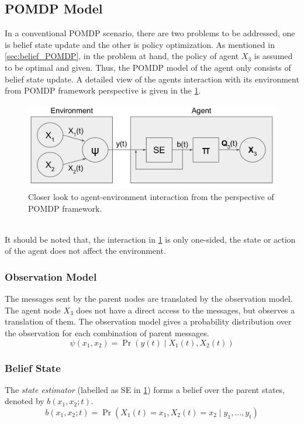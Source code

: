 \subsection{POMDP Model}
In a conventional POMDP scenario, there are two problems to be addressed, one is belief state update and the other is policy optimization. As mentioned in \cref{sec:belief_POMDP}, in the problem at hand, the policy of agent $ X_3 $ is assumed to be optimal and given. Thus, the POMDP model of the agent only consists of belief state update. A detailed view of the agents interaction with its environment from POMDP framework perspective is given in the \cref{fig:POMDP_pers}. \\
\begin{figure}[htb]
	\begin{center}
		\includegraphics[width=.75\textwidth]{figures/POMDP_graph}
		\caption{Closer look to agent-environment interaction from the perspective of POMDP framework.}
		\label{fig:POMDP_pers}
	\end{center}
\end{figure}\\
It should be noted that, the interaction in \cref{fig:POMDP_pers} is only one-sided, the state or action of the agent does not affect the environment.
\subsubsection{Observation Model}
The messages sent by the parent nodes are translated by the observation model. The agent node $ X_3 $ does not have a direct access to the messages, but observes a translation of them. The observation model gives a probability distribution over the observation for each combination of parent messages.
\begin{equation}
\psi(x_1, x_2) = \operatorname{Pr}(y(t) \mid X_{1}(t), X_{2}(t))
\end{equation}

\subsubsection{Belief State}
The \textit{state estimator} (labelled as SE in \cref{fig:POMDP_pers}) forms a belief over the parent states, denoted by $  b(x_{1}, x_{2}; t) $. 
\begin{equation}
b(x_{1}, x_{2}; t) = \operatorname{Pr}( X_{1}(t) = x_{1},  X_{2}(t) = x_{2}\mid y_{1}, ..., y_{t})
\end{equation}

